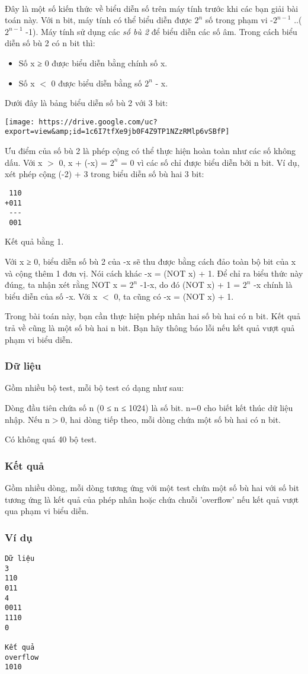 

 

Đây là một số kiến thức về biểu diễn số trên máy tính trước khi các bạn giải bài toán này. Với n bit, máy tính có thể biểu diễn được $2^{n}$ số trong phạm vi -$2^{n-1}$ ..($2^{n-1}$ -1). Máy tính sử dụng các \emph{ số bù 2 } để biểu diễn các số âm. Trong cách biểu diễn số bù 2 có n bit thì:
\begin{itemize}
	\item Số x ≥ 0 được biểu diễn bằng chính số x.
	\item Số x $<$ 0 được biểu diễn bằng số $2^{n}$ - x.
\end{itemize}

Dưới đây là bảng biểu diễn số bù 2 với 3 bit:


\texttt{[image: https://drive.google.com/uc?export=view\&amp;id=1c6I7tfXe9jb0F4Z9TP1NZzRMlp6vSBfP]}

Ưu điểm của số bù 2 là phép cộng có thể thực hiện hoàn toàn như các số không dấu. Với x $>$ 0, x + (-x) = $2^{n}$ = 0 vì các số chỉ được biểu diễn bởi n bit. Ví dụ, xét phép cộng (-2) + 3 trong biểu diễn số bù hai 3 bit:
\begin{verbatim}
 110
+011
 ---
 001
\end{verbatim}

Kết quả bằng 1.

Với x ≥ 0, biểu diễn số bù 2 của -x sẽ thu được bằng cách đảo toàn bộ bit của x và cộng thêm 1 đơn vị. Nói cách khác -x = (NOT x) + 1. Để chỉ ra biểu thức này đúng, ta nhận xét rằng NOT x = $2^{n}$ -1-x, do đó (NOT x) + 1 = $2^{n}$ -x chính là biểu diễn của số -x. Với x $<$ 0, ta cũng có -x = (NOT x) + 1.

Trong bài toán này, bạn cần thực hiện phép nhân hai số bù hai có n bit. Kết quả trả về cũng là một số bù hai n bit. Bạn hãy thông báo lỗi nếu kết quả vượt quả phạm vi biểu diễn.

\subsubsection{Dữ liệu}

Gồm nhiều bộ test, mỗi bộ test có dạng như sau:

Dòng đầu tiên chứa số n (0 ≤ n ≤ 1024) là số bit. n=0 cho biết kết thúc dữ liệu nhập. Nếu n$>$0, hai dòng tiếp theo, mỗi dòng chứa một số bù hai có n bit.

Có không quá 40 bộ test.

\subsubsection{Kết quả}

Gồm nhiều dòng, mỗi dòng tương ứng với một test chứa một số bù hai với số bit tương ứng là kết quả của phép nhân hoặc chứa chuỗi 'overflow' nếu kết quả vượt qua phạm vi biểu diễn.

\subsubsection{Ví dụ}
\begin{verbatim}
Dữ liệu
3
110
011
4
0011
1110
0

Kết quả
overflow
1010
\end{verbatim}
